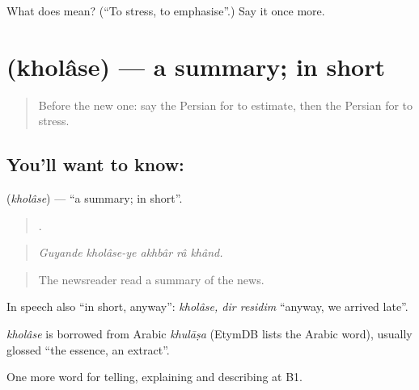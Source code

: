 \begin{tcolorbox}[breakable,colback=teal!4,colframe=teal!35!black,title={Before you move on}]
What does   mean? (\textquotedblleft{}To stress, to emphasise\textquotedblright{}.) Say it once more.
\end{tcolorbox}
\section[\texorpdfstring{\fa{خلاصه} (kholâse)}{خلاصه (kholâse)}]{ (kholâse) — a summary; in short}

\label{lesson:FA-C313-kholase}



\begin{quote}
Before the new one: say the Persian for to estimate, then the Persian for to stress.
\end{quote}

\subsection*{You'll want to know: }
\textbf{} (\emph{kholâse}) — \textquotedblleft{}a summary; in short\textquotedblright{}.

\begin{quote}
    .
\end{quote}

\begin{quote}
\emph{Guyande kholâse-ye akhbâr râ khând.}
\end{quote}

\begin{quote}
The newsreader read a summary of the news.
\end{quote}

In speech also \textquotedblleft{}in short, anyway\textquotedblright{}: \emph{kholâse, dir residim} \textquotedblleft{}anyway, we arrived late\textquotedblright{}.

\begin{cousinweb}
\emph{kholâse} is borrowed from Arabic \emph{khulāṣa} (EtymDB lists the Arabic word), usually glossed \textquotedblleft{}the essence, an extract\textquotedblright{}.
\end{cousinweb}

\begin{grammarlens}[title={What you've built}]
One more word for telling, explaining and describing at B1.
\end{grammarlens}

